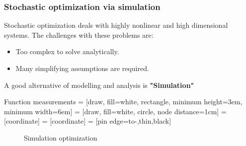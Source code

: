 \begin{frame}
\frametitle{\centering  Stochastic optimization via simulation}
\begin{small}
\begin{block}{}
Stochastic optimization deals with  highly nonlinear and high dimensional systems. The challenges with these problems are:
\begin{itemize}
\item Too complex to solve analytically.
\item Many simplifying assumptions are  required.
\end{itemize}
\end{block}
\pause
\begin{block}{}
A good alternative of modelling and analysis is \textbf{"Simulation"}
\end{block}
\pause
\begin{block}{Function measurements}
 = [draw, fill=white, rectangle,
   minimum height=3em, minimum width=6em]
 = [draw, fill=white, circle, node distance=1cm]
 = [coordinate]
 = [coordinate]
 = [pin edge={to-,thin,black}]

 \begin{figure}[t]
    \centering
{}
\caption{Simulation optimization}
\label{fig:so}
\end{figure}

\end{block}
\end{small}
\end{frame}




